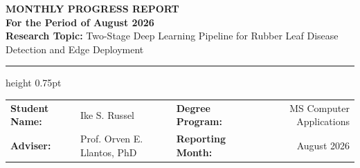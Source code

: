 \documentclass[10pt,a4paper]{article}
\begin{document}
\begin{center}
    {\Large\textbf{\textcolor{navyblue}{MONTHLY PROGRESS REPORT}}}\\[4pt]
    {\large\textbf{For the Period of August 2026}}\\[6pt]
    {\normalsize\textbf{Research Topic:} Two-Stage Deep Learning Pipeline for Rubber Leaf Disease Detection and Edge Deployment}
\end{center}

\vspace{0.2cm}
\hrule height 0.75pt
\vspace{0.35cm}

\noindent
\begin{tabularx}{\textwidth}{@{}l X l r@{}}
    \textbf{Student Name:} & Ike S. Russel & \textbf{Degree Program:} & MS Computer Applications \\
    \textbf{Adviser:} & Prof. Orven E. Llantos, PhD & \textbf{Reporting Month:} & August 2026 \\
\end{tabularx}

\vspace{0.4cm}
\end{document}
